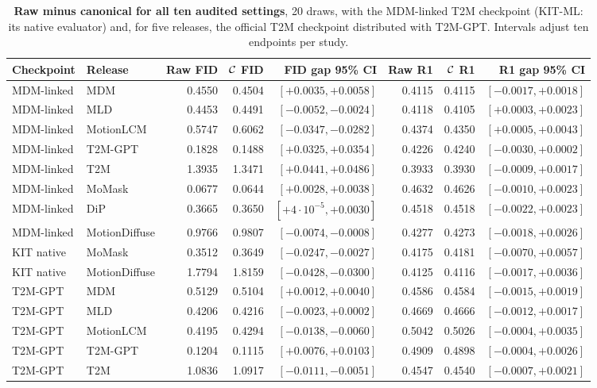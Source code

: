 \begin{table}[t]\centering\footnotesize
\caption{\textbf{Raw minus canonical for all ten audited settings}, 20 draws, with the MDM-linked T2M checkpoint (KIT-ML: its native evaluator) and, for five releases, the official T2M checkpoint distributed with T2M-GPT. Intervals adjust ten endpoints per study.}\label{tab:readers2}
\begin{tabular}{llrrrrrr}\toprule
Checkpoint&Release&Raw FID&$\mathcal{C}$ FID&FID gap 95\% CI&Raw R1&$\mathcal{C}$ R1&R1 gap 95\% CI\\\midrule
MDM-linked&MDM&0.4550&0.4504&$[+0.0035,+0.0058]$&0.4115&0.4115&$[-0.0017,+0.0018]$\\
MDM-linked&MLD&0.4453&0.4491&$[-0.0052,-0.0024]$&0.4118&0.4105&$[+0.0003,+0.0023]$\\
MDM-linked&MotionLCM&0.5747&0.6062&$[-0.0347,-0.0282]$&0.4374&0.4350&$[+0.0005,+0.0043]$\\
MDM-linked&T2M-GPT&0.1828&0.1488&$[+0.0325,+0.0354]$&0.4226&0.4240&$[-0.0030,+0.0002]$\\
MDM-linked&T2M&1.3935&1.3471&$[+0.0441,+0.0486]$&0.3933&0.3930&$[-0.0009,+0.0017]$\\
MDM-linked&MoMask&0.0677&0.0644&$[+0.0028,+0.0038]$&0.4632&0.4626&$[-0.0010,+0.0023]$\\
MDM-linked&DiP&0.3665&0.3650&$[+4\cdot10^{-5},+0.0030]$&0.4518&0.4518&$[-0.0022,+0.0023]$\\
MDM-linked&MotionDiffuse&0.9766&0.9807&$[-0.0074,-0.0008]$&0.4277&0.4273&$[-0.0018,+0.0026]$\\
KIT native&MoMask&0.3512&0.3649&$[-0.0247,-0.0027]$&0.4175&0.4181&$[-0.0070,+0.0057]$\\
KIT native&MotionDiffuse&1.7794&1.8159&$[-0.0428,-0.0300]$&0.4125&0.4116&$[-0.0017,+0.0036]$\\
\midrule
T2M-GPT&MDM&0.5129&0.5104&$[+0.0012,+0.0040]$&0.4586&0.4584&$[-0.0015,+0.0019]$\\
T2M-GPT&MLD&0.4206&0.4216&$[-0.0023,+0.0002]$&0.4669&0.4666&$[-0.0012,+0.0017]$\\
T2M-GPT&MotionLCM&0.4195&0.4294&$[-0.0138,-0.0060]$&0.5042&0.5026&$[-0.0004,+0.0035]$\\
T2M-GPT&T2M-GPT&0.1204&0.1115&$[+0.0076,+0.0103]$&0.4909&0.4898&$[-0.0004,+0.0026]$\\
T2M-GPT&T2M&1.0836&1.0917&$[-0.0111,-0.0051]$&0.4547&0.4540&$[-0.0007,+0.0021]$\\
\bottomrule\end{tabular}\end{table}
